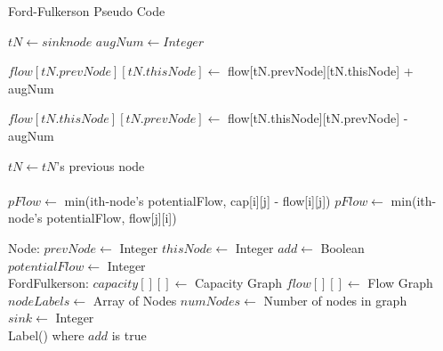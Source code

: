     \begin{algorithm}
        \caption{Ford-Fulkerson Pseudo Code}
        \label{alg:FFSequential}
        \begin{algorithmic}[1]
                \State $tN \gets sink node$ 
                \State $augNum \gets Integer$ 
            
                        \State $flow[tN.prevNode][tN.thisNode] \gets$ flow[tN.prevNode][tN.thisNode] + augNum
                    
                    \Else \State $flow[tN.thisNode][tN.prevNode] \gets$ flow[tN.thisNode][tN.prevNode] - augNum
                        
                    \EndIf
                    
                    \State $tN \gets tN$'s previous node
                \EndWhile
            \EndFunction\\\\
    
                	\State 
                	    $pFlow \gets$ min(ith-node's potentialFlow, cap[i][j] - flow[i][j])
                \Else
                    \State
    			        $pFlow \gets$ min(ith-node's potentialFlow, flow[j][i])
                \EndIf
            \EndFunction
        \end{algorithmic}
        \begin{algorithmic}[1]
            \State Node:
                \State $prevNode \gets$ Integer
                \State $thisNode \gets$ Integer
                \State $add \gets$ Boolean
                \State $potentialFlow \gets$ Integer\\
                
            
            \State FordFulkerson:
                \State $capacity[][] \gets$ Capacity Graph
                \State $flow[][] \gets$ Flow Graph
                \State $nodeLabels \gets$ Array of Nodes
                \State $numNodes \gets$ Number of nodes in graph\\
                \State $sink \gets$ Integer\\
                
                                \State
                                        Label() where $add$ is true
                                    \EndIf
                                    

\end{algorithmic}
\end{algorithm}
